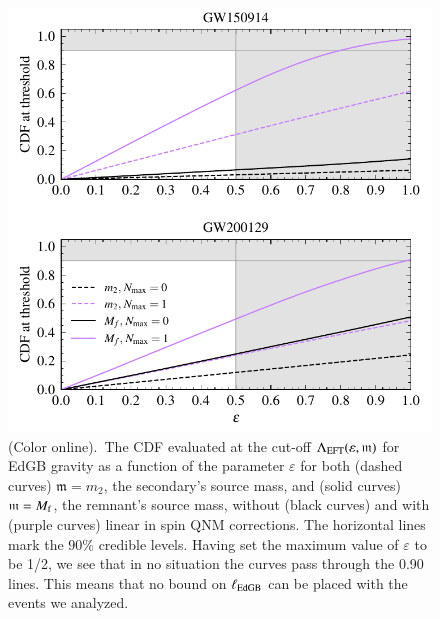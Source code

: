 \documentclass[twocolumn,
               prd,
               aps,
               superscriptaddress,
               tightenlines,
               nofootinbib,
               eqsecnum,
               amsfonts,
               amsmath,
               longbibliography]{revtex4-1}
\newcommand{\gm}{\mathfrak{m}}
\begin{document}
\begin{figure}[t]
\includegraphics[width=\columnwidth]{figs/edgb_cdf_varying_threshold.pdf}
\caption{(Color online).~The CDF evaluated at the
cut-off $\Lambda_{\rm EFT}(\varepsilon,\gm)$ for EdGB gravity as a function of the parameter
$\varepsilon$ for both (dashed curves) $\gm = m_2$, the secondary's source
mass, and (solid curves) $\gm = M_{\rm f}$, the remnant's source mass, without
(black curves) and with (purple curves) linear in spin QNM corrections. The
horizontal lines mark the $90\%$ credible levels. Having set the maximum value
of $\varepsilon$ to be 1/2, we see that in no situation the curves pass
through the 0.90 lines. This means that no bound on $\ell_{\rm EdGB}$ can be placed
with the events we analyzed.
}
\label{fig:edgb_cdf}
\end{figure}
\end{document}
